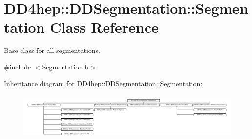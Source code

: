 \hypertarget{class_d_d4hep_1_1_d_d_segmentation_1_1_segmentation}{}\section{D\+D4hep\+:\+:D\+D\+Segmentation\+:\+:Segmentation Class Reference}
\label{class_d_d4hep_1_1_d_d_segmentation_1_1_segmentation}


Base class for all segmentations.  




{\ttfamily \#include $<$Segmentation.\+h$>$}

Inheritance diagram for D\+D4hep\+:\+:D\+D\+Segmentation\+:\+:Segmentation\+:\begin{figure}[H]
\begin{center}
\leavevmode
\includegraphics[height=2.432139cm]{class_d_d4hep_1_1_d_d_segmentation_1_1_segmentation}
\end{center}
\end{figure}
